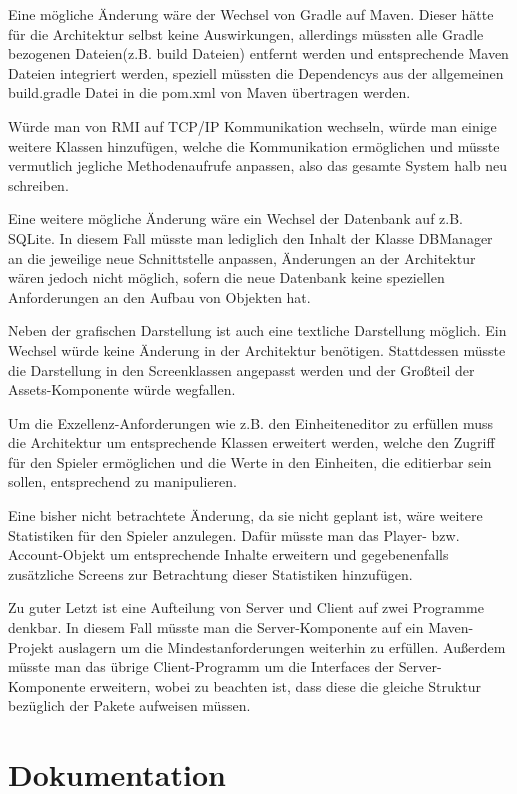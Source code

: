 \documentclass[fontsize=12pt,paper=a4,twoside]{scrartcl}
\begin{document}
\label{sec:evolution}

Eine mögliche Änderung wäre der Wechsel von Gradle auf Maven. Dieser hätte für die Architektur selbst keine Auswirkungen, allerdings müssten alle Gradle bezogenen Dateien(z.B. build Dateien) entfernt werden und entsprechende Maven Dateien integriert werden, speziell müssten die Dependencys aus der allgemeinen build.gradle Datei in die pom.xml von Maven übertragen werden.

Würde man von RMI auf TCP/IP Kommunikation wechseln, würde man einige weitere Klassen hinzufügen, welche die Kommunikation ermöglichen und müsste vermutlich jegliche Methodenaufrufe anpassen, also das gesamte System halb neu schreiben.

Eine weitere mögliche Änderung wäre ein Wechsel der Datenbank auf z.B. SQLite. In diesem Fall müsste man lediglich den Inhalt der Klasse DBManager an die jeweilige neue Schnittstelle anpassen, Änderungen an der Architektur wären jedoch nicht möglich, sofern die neue Datenbank keine speziellen Anforderungen an den Aufbau von Objekten hat.

Neben der grafischen Darstellung ist auch eine textliche Darstellung möglich. Ein Wechsel würde keine Änderung in der Architektur benötigen. Stattdessen müsste die Darstellung in den Screenklassen angepasst werden und der Großteil der Assets-Komponente würde wegfallen.

Um die Exzellenz-Anforderungen wie z.B. den Einheiteneditor zu erfüllen muss die Architektur um entsprechende Klassen erweitert werden, welche den Zugriff für den Spieler ermöglichen und die Werte in den Einheiten, die editierbar sein sollen, entsprechend zu manipulieren.

Eine bisher nicht betrachtete Änderung, da sie nicht geplant ist, wäre weitere Statistiken für den Spieler anzulegen. Dafür müsste man das Player- bzw. Account-Objekt um entsprechende Inhalte erweitern und gegebenenfalls zusätzliche Screens zur Betrachtung dieser Statistiken hinzufügen.

Zu guter Letzt ist eine Aufteilung von Server und Client auf zwei Programme denkbar. In diesem Fall müsste man die Server-Komponente auf ein Maven-Projekt auslagern um die Mindestanforderungen weiterhin zu erfüllen. Außerdem müsste man das übrige Client-Programm um die Interfaces der Server-Komponente erweitern, wobei zu beachten ist, dass diese die gleiche Struktur bezüglich der Pakete aufweisen müssen.

\section{Dokumentation}
\end{document}
